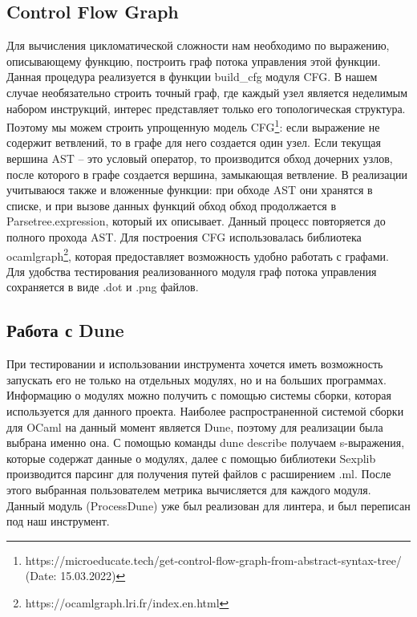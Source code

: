 \subsection{Control Flow Graph}
Для вычисления цикломатической сложности нам необходимо
по выражению, описывающему функцию, построить граф потока
управления этой функции. Данная процедура реализуется в функции build\_cfg модуля CFG. В нашем случае необязательно строить точный граф, где каждый узел является неделимым набором инструкций, интерес представляет только его
топологическая структура. Поэтому мы можем строить
упрощенную модель CFG\footnote{https://microeducate.tech/get-control-flow-graph-from-abstract-syntax-tree/ (Date: 15.03.2022)}: если выражение не содержит ветвлений, то в графе для
него создается один узел. Если текущая вершина AST -- это условый оператор, то производится обход дочерних узлов, после которого в графе создается вершина,
замыкающая ветвление. В реализации учитываюся также и вложенные функции: при обходе
AST они хранятся в списке, и при вызове данных функций обход обход продолжается в Parsetree.expression, который их описывает. 
Данный процесс повторяется до полного прохода AST.
Для построения CFG использовалась библиотека 
ocamlgraph\footnote{https://ocamlgraph.lri.fr/index.en.html}, которая 
предоставляет возможность удобно работать с графами. Для удобства тестирования реализованного модуля
граф потока управления сохраняется в виде .dot и .png файлов.
\subsection{Работа с Dune}
При тестировании и использовании инструмента хочется
иметь возможность запускать его не только на отдельных модулях, 
но и на больших программах. Информацию о модулях можно
получить с помощью системы сборки, которая используется для данного проекта. Наиболее распространенной системой сборки
для OCaml на данный момент является Dune, поэтому для реализации
была выбрана именно она. С помощью команды 
dune describe получаем s-выражения, которые содержат данные 
о модулях, далее с помощью библиотеки Sexplib производится
парсинг для получения путей файлов с расширением .ml. После этого
выбранная пользователем метрика вычисляется для каждого модуля.
Данный модуль (ProcessDune) уже был реализован для линтера, и был 
переписан
под наш инструмент.
\newpage
